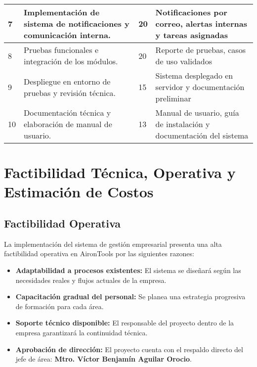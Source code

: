 \begin{longtable}{p{} p{} p{} p{}}
7 & Implementación de sistema de notificaciones y comunicación interna. & 20 & Notificaciones por correo, alertas internas y tareas asignadas \\
\midrule

8 & Pruebas funcionales e integración de los módulos. & 20 & Reporte de pruebas, casos de uso validados \\
\midrule

9 & Despliegue en entorno de pruebas y revisión técnica. & 15 & Sistema desplegado en servidor y documentación preliminar \\
\midrule

10 & Documentación técnica y elaboración de manual de usuario. & 13 & Manual de usuario, guía de instalación y documentación del sistema \\
\bottomrule
\end{longtable}


\section{Factibilidad Técnica, Operativa y Estimación de Costos}

\subsection{Factibilidad Operativa}

La implementación del sistema de gestión empresarial presenta una alta factibilidad operativa en AironTools por las siguientes razones:

\begin{itemize}
    \item \textbf{Adaptabilidad a procesos existentes:} El sistema se diseñará según las necesidades reales y flujos actuales de la empresa.
    \item \textbf{Capacitación gradual del personal:} Se planea una estrategia progresiva de formación para cada área.
    \item \textbf{Soporte técnico disponible:} El responsable del proyecto dentro de la empresa garantizará la continuidad técnica.
    \item \textbf{Aprobación de dirección:} El proyecto cuenta con el respaldo directo del jefe de área: \textbf{Mtro. Víctor Benjamín Aguilar Orocio}.
\end{itemize}

